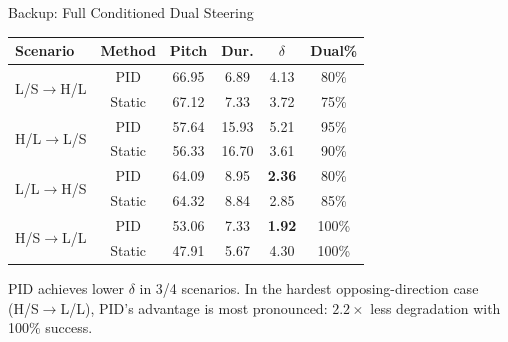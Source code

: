 \documentclass[aspectratio=169, 11pt]{beamer}
\begin{document}
\begin{frame}[noframenumbering]{Backup: Full Conditioned Dual Steering}

\begin{table}
\centering\small
\begin{tabular}{lccccc}
  \toprule
  Scenario & Method & Pitch & Dur. & $\delta$ & Dual\% \\
  \midrule
  \multirow{2}{*}{L/S$\to$H/L} & PID & 66.95 & 6.89 & 4.13 & 80\% \\
  & Static & 67.12 & 7.33 & 3.72 & 75\% \\
  \midrule
  \multirow{2}{*}{H/L$\to$L/S} & PID & 57.64 & 15.93 & 5.21 & 95\% \\
  & Static & 56.33 & 16.70 & 3.61 & 90\% \\
  \midrule
  \multirow{2}{*}{L/L$\to$H/S} & PID & 64.09 & 8.95 & \textbf{2.36} & 80\% \\
  & Static & 64.32 & 8.84 & 2.85 & 85\% \\
  \midrule
  \multirow{2}{*}{H/S$\to$L/L} & PID & 53.06 & 7.33 & \textbf{1.92} & 100\% \\
  & Static & 47.91 & 5.67 & 4.30 & 100\% \\
  \bottomrule
\end{tabular}
\end{table}

{\small PID achieves lower $\delta$ in 3/4 scenarios. In the hardest opposing-direction case (H/S$\to$L/L), PID's advantage is most pronounced: $2.2\times$ less degradation with 100\% success.}
\end{frame}
\end{document}
